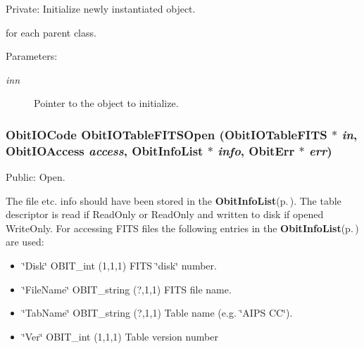 Private: Initialize newly instantiated object. 

for each parent class. \begin{Desc}
\item[Parameters:]
\begin{description}
\item[{\em inn}]Pointer to the object to initialize. \end{description}
\end{Desc}
\subsubsection{\setlength{\rightskip}{0pt plus 5cm}Obit\-IOCode Obit\-IOTable\-FITSOpen ({\bf Obit\-IOTable\-FITS} $\ast$ {\em in}, Obit\-IOAccess {\em access}, {\bf Obit\-Info\-List} $\ast$ {\em info}, {\bf Obit\-Err} $\ast$ {\em err})}\label{ObitIOTableFITS_8c_a18}


Public: Open. 

The file etc. info should have been stored in the {\bf Obit\-Info\-List}{\rm (p.\,\pageref{structObitInfoList})}. The table descriptor is read if Read\-Only or Read\-Only and written to disk if opened Write\-Only. For accessing FITS files the following entries in the {\bf Obit\-Info\-List}{\rm (p.\,\pageref{structObitInfoList})} are used: \begin{itemize}
\item \char`\"{}Disk\char`\"{} OBIT\_\-int (1,1,1) FITS \char`\"{}disk\char`\"{} number. \item \char`\"{}File\-Name\char`\"{} OBIT\_\-string (?,1,1) FITS file name. \item \char`\"{}Tab\-Name\char`\"{} OBIT\_\-string (?,1,1) Table name (e.g. \char`\"{}AIPS CC\char`\"{}). \item \char`\"{}Ver\char`\"{} OBIT\_\-int (1,1,1) Table version number 
\end{itemize}
